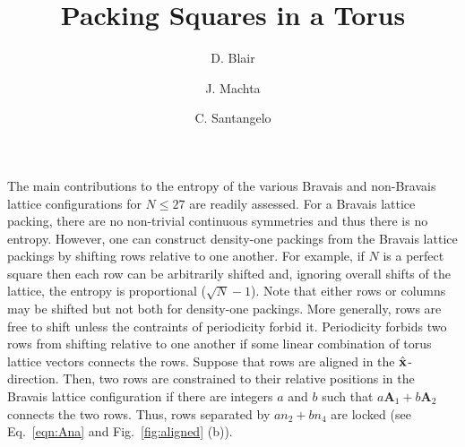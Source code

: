\documentclass[preprint,aps]{revtex4}
\newcommand{\ax}{{\bf a}_1}
\newcommand{\ay}{{\bf a}_2}
\begin{document}
\title{Packing Squares in a Torus}

\author{D. Blair}

\author{J. Machta}

\author{C. Santangelo}
 
 The main contributions to the entropy of the various Bravais and non-Bravais lattice configurations for $N \leq 27$ are readily assessed. 
 For a Bravais lattice packing, there are no non-trivial continuous symmetries and thus there is no entropy.  However, one can construct density-one packings from the Bravais lattice packings by shifting rows relative to one another.  For example, if $N$ is a perfect square then each row can be arbitrarily shifted and, ignoring overall shifts of the lattice, the entropy is proportional  ($\sqrt{N}-1$).  Note that either rows or columns may be shifted but not both for density-one packings.  More generally, rows are free to shift unless the contraints of periodicity forbid it.  Periodicity forbids two rows from shifting relative to one another if some linear combination of torus lattice vectors connects the rows.  Suppose that rows are aligned in the $\hat{\bf x}$-direction.  Then, two rows are constrained to their relative positions in the Bravais lattice configuration if there are integers $a$ and $b$ such that $a \mathbf{A}_1 + b \mathbf{A}_2$ connects the two rows. Thus, rows separated by $a n_2 + b n_4$ are locked (see Eq.\ \ref{eqn:Ana} and Fig.\  \ref{fig:aligned} (b)).
\end{document}
